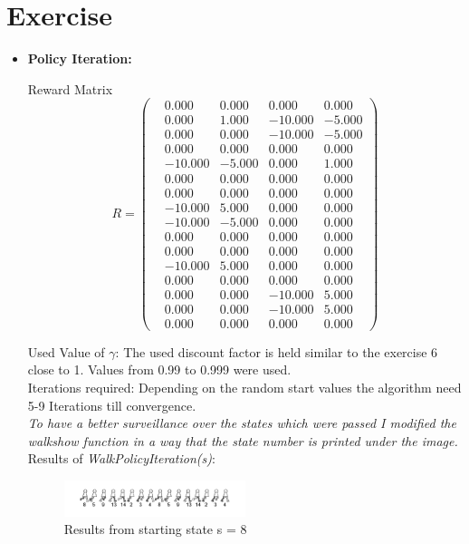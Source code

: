 \documentclass[conference]{IEEEtran}
\begin{document}
\section{Exercise}
\begin{itemize}

\item \textbf{Policy Iteration:}

Reward Matrix
$$
R =
 \begin{pmatrix}
 &0.000 &0.000 &0.000 &0.000\\
 &0.000 &1.000 &-10.000 &-5.000\\
 &0.000 &0.000 &-10.000 &-5.000\\
 &0.000 &0.000 &0.000 &0.000\\
 &-10.000 &-5.000 &0.000 &1.000\\
 &0.000 &0.000 &0.000 &0.000\\
 &0.000 &0.000 &0.000 &0.000\\
 &-10.000 &5.000 &0.000 &0.000\\
 &-10.000 &-5.000 &0.000 &0.000\\
 &0.000 &0.000 &0.000 &0.000\\
 &0.000 &0.000 &0.000 &0.000\\
 &-10.000 &5.000 &0.000 &0.000\\
 &0.000 &0.000 &0.000 &0.000\\
 &0.000 &0.000 &-10.000 &5.000\\
 &0.000 &0.000 &-10.000 &5.000\\
 &0.000 &0.000 &0.000 &0.000
 \end{pmatrix}
$$

Used Value of $\gamma$: The used discount factor is held similar to the exercise 6 close to 1. Values from 0.99 to 0.999 were used.  \\

Iterations required: Depending on the random start values the algorithm need 5-9 Iterations till convergence.\\

\textit{To have a better surveillance over the states which were passed I modified the walkshow function in a way that the state number is printed under the image.}\\

Results of \textit{WalkPolicyIteration(s)}:

\begin{figure}[h!]
  	\centering
    \includegraphics[width=0.5\textwidth]{img/3walkshow8.png}
    \caption{Results from starting state s = 8}
    \label{fig:3walkshow8}
\end{figure}


\end{itemize}
\end{document}
